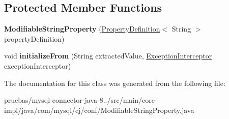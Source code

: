 \subsection*{Protected Member Functions}
\begin{DoxyCompactItemize}
\item 
\mbox{\label{classcom_1_1mysql_1_1cj_1_1conf_1_1_modifiable_string_property_a71da56f8aed2b7045daf226d8b462316}} 
{\bfseries Modifiable\+String\+Property} (\mbox{\hyperlink{interfacecom_1_1mysql_1_1cj_1_1conf_1_1_property_definition}{Property\+Definition}}$<$ String $>$ property\+Definition)
\item 
\mbox{\label{classcom_1_1mysql_1_1cj_1_1conf_1_1_modifiable_string_property_a6afc0604f79ba60d05bc9891e1b6c5cb}} 
void {\bfseries initialize\+From} (String extracted\+Value, \mbox{\hyperlink{interfacecom_1_1mysql_1_1cj_1_1exceptions_1_1_exception_interceptor}{Exception\+Interceptor}} exception\+Interceptor)
\end{DoxyCompactItemize}


The documentation for this class was generated from the following file\+:\begin{DoxyCompactItemize}
\item 
pruebas/mysql-\/connector-\/java-\/8../src/main/core-\/impl/java/com/mysql/cj/conf/Modifiable\+String\+Property.\+java\end{DoxyCompactItemize}
